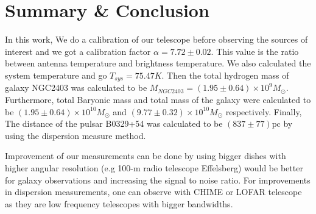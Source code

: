 \documentclass[12pt]{article}
\begin{document}
\section{Summary \& Conclusion}

In this work, We do a calibration of our telescope before observing the sources of interest and we got a calibration factor $\alpha = 7.72 \pm 0.02$. This value is the ratio between antenna temperature and brightness temperature. We also calculated the system temperature and go $T_{sys} = 75.47 K$. Then the total hydrogen mass of galaxy NGC2403 was calculated to be $M_{NGC2403} = (1.95 \pm 0.64) \times 10^{9} M_{\odot}$. Furthermore, total Baryonic mass and total mass of the galaxy were calculated to be $(1.95\pm0.64)\times 10^{10}M_{\odot}$ and $(9.77\pm0.32)\times 10^{10}M_{\odot}$ respectively. Finally, The distance of the pulsar B0329+54 was calculated to be $(837 \pm 77) \mathrm{pc}$ 
by using the dispersion measure method.

Improvement of our measurements can be done by using bigger dishes with higher angular resolution (e.g 100-m radio telescope Effelsberg) would be better for galaxy observations and increasing the signal to noise ratio. For improvements in dispersion measurements, one can observe with CHIME or LOFAR telescope as they are low frequency telescopes with bigger bandwidths. 

\printbibliography
\end{document}
